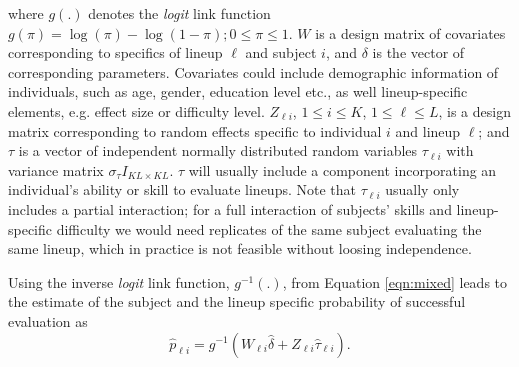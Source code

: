 \documentclass[12pt]{article}
\newcommand{\red}[1]{{\color{red} #1}}
\begin{document}
\noindent where $g(.)$ denotes the {\it logit} link function $g(\pi)=\log(\pi) - \log(1-\pi); 0 \le \pi \le 1$.
$W$ is a design matrix of covariates corresponding to specifics of lineup $\ell$ and subject $i$, and $\delta$ is the vector of corresponding parameters. Covariates could include  demographic information of individuals, such as age, gender, education level etc.,  as well lineup-specific elements, e.g. effect size or difficulty level.
%
$Z_{\ell i}$,  $1 \le i \le K$, $1 \le \ell \le L$,  is a design matrix corresponding to random effects specific to individual $i$ and lineup $\ell$; and 
$\tau$  is a vector of independent normally distributed random variables $\tau_{\ell i}$ with  variance matrix $\sigma_\tau I_{KL \times KL}$. $\tau$ will usually include a component incorporating an individual's ability or skill to evaluate lineups. 
Note that $\tau_{\ell i }$ usually only includes a partial interaction; for a full interaction of subjects' skills and lineup-specific difficulty we would need replicates of the same subject evaluating the same lineup, which in practice is not feasible without loosing independence.

\noindent Using the inverse {\it logit} link function, $g^{-1}(.)$, from  Equation \ref{eqn:mixed} leads to the estimate of the subject and the lineup specific probability of successful evaluation as 
\begin{equation} \label{eqn:mixed_power}
\hat p_{\ell i} =  g^{-1}(W_{\ell i} \hat {\delta} +  Z_{\ell i}  \hat {\tau}_{\ell i}).
\end{equation}


\end{document}
